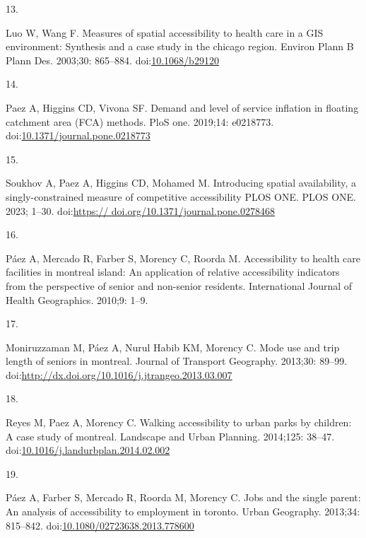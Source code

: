 \documentclass[10pt,letterpaper]{article}
\newlength{\cslhangindent}
\newlength{\csllabelwidth}
\newlength{\cslentryspacingunit} %
\newenvironment{CSLReferences}[2] %
 {%
  \setlength{\parindent}{0pt}
  \ifodd #1
  \let\oldpar\par
  \def\par{\hangindent=\cslhangindent\oldpar}
  \fi
  \setlength{\parskip}{#2\cslentryspacingunit}
 }%
 {}
\newcommand{\CSLLeftMargin}[1]{\parbox[t]{\csllabelwidth}{#1}}
\newcommand{\CSLRightInline}[1]{\parbox[t]{\linewidth - \csllabelwidth}{#1}\break}
\begin{document}
\begin{CSLReferences}{0}{0}
\leavevmode{}%
\CSLLeftMargin{13. }%
\CSLRightInline{Luo W, Wang F. Measures of spatial accessibility to
health care in a {GIS} environment: Synthesis and a case study in the
chicago region. Environ Plann B Plann Des. 2003;30: 865--884.
doi:\href{https://doi.org/10.1068/b29120}{10.1068/b29120}}

\leavevmode{}%
\CSLLeftMargin{14. }%
\CSLRightInline{Paez A, Higgins CD, Vivona SF. Demand and level of
service inflation in floating catchment area (FCA) methods. PloS one.
2019;14: e0218773.
doi:\href{https://doi.org/10.1371/journal.pone.0218773}{10.1371/journal.pone.0218773}}

\leavevmode{}%
\CSLLeftMargin{15. }%
\CSLRightInline{Soukhov A, Paez A, Higgins CD, Mohamed M. Introducing
spatial availability, a singly-constrained measure of competitive
accessibility \textbar{} {PLOS ONE}. PLOS ONE. 2023; 1--30.
doi:\href{https://\%20doi.org/10.1371/journal.pone.0278468}{https://
doi.org/10.1371/journal.pone.0278468}}

\leavevmode{}%
\CSLLeftMargin{16. }%
\CSLRightInline{Páez A, Mercado R, Farber S, Morency C, Roorda M.
Accessibility to health care facilities in montreal island: An
application of relative accessibility indicators from the perspective of
senior and non-senior residents. International Journal of Health
Geographics. 2010;9: 1--9. }

\leavevmode{}%
\CSLLeftMargin{17. }%
\CSLRightInline{Moniruzzaman M, Páez A, Nurul Habib KM, Morency C. Mode
use and trip length of seniors in montreal. Journal of Transport
Geography. 2013;30: 89--99.
doi:\url{http://dx.doi.org/10.1016/j.jtrangeo.2013.03.007}}

\leavevmode{}%
\CSLLeftMargin{18. }%
\CSLRightInline{Reyes M, Paez A, Morency C. Walking accessibility to
urban parks by children: A case study of montreal. Landscape and Urban
Planning. 2014;125: 38--47.
doi:\href{https://doi.org/10.1016/j.landurbplan.2014.02.002}{10.1016/j.landurbplan.2014.02.002}}

\leavevmode{}%
\CSLLeftMargin{19. }%
\CSLRightInline{Páez A, Farber S, Mercado R, Roorda M, Morency C. Jobs
and the single parent: An analysis of accessibility to employment in
toronto. Urban Geography. 2013;34: 815--842.
doi:\href{https://doi.org/10.1080/02723638.2013.778600}{10.1080/02723638.2013.778600}}


\end{CSLReferences}
\end{document}

